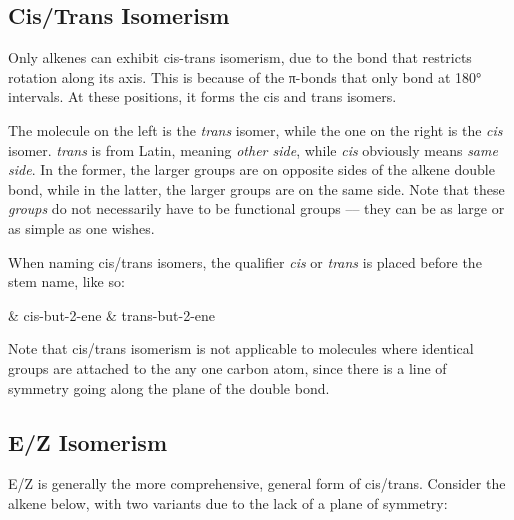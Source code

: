 		\pagebreak
		\subsection{Cis/Trans Isomerism}

			Only alkenes can exhibit cis-trans isomerism, due to the  bond that restricts rotation along its axis. This is because
			of the π-bonds that only bond at 180° intervals. At these positions, it forms the cis and trans isomers.


			The molecule on the left is the \textit{trans} isomer, while the one on the right is the \textit{cis} isomer. \textit{trans}
			is from Latin, meaning \textit{other side}, while \textit{cis} obviously means \textit{same side}. In the former,
			the larger groups are on opposite sides of the alkene double bond, while in the latter, the larger groups are on the same
			side. Note that these \textit{groups} do not necessarily have to be functional groups –– they can be as large or as simple
			as one wishes.

			When naming cis/trans isomers, the qualifier \textit{cis} or \textit{trans} is placed before the stem name, like so:
			\begin{bulletlist}
				& cis-but-2-ene
				& trans-but-2-ene
			\end{bulletlist}

			Note that cis/trans isomerism is not applicable to molecules where identical groups are attached to the any one carbon atom,
			since there is a line of symmetry going along the plane of the double bond.






		\pagebreak
		\subsection{E/Z Isomerism}

			E/Z is generally the more comprehensive, general form of cis/trans. Consider the alkene below, with two variants
			due to the lack of a plane of symmetry:

